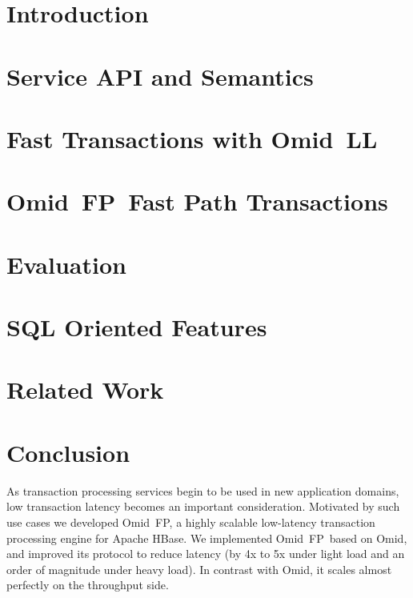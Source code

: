 \documentclass{vldb}
\newcommand{\sys}{Omid~FP}
\newcommand{\sysll}{Omid~LL}
\begin{document}

\section{Introduction} \label{sec:intro}
 

\section{Service API and Semantics} \label{sec:api}


\section{Fast Transactions with \sysll} \label{sec:ll}



\section{\sys\ Fast Path Transactions}
\label{sec:alg}


\section{Evaluation} \label{sec:eval}


\section{SQL Oriented Features} \label{sec:sql}


\section{Related Work} \label{sec:related}


\section{Conclusion} \label{sec:conclusions}

As transaction processing services begin to be used in new application domains, low 
transaction latency becomes an important consideration. 
Motivated by such use cases we developed \sys, a highly scalable 
low-latency transaction processing engine for Apache HBase. 
We implemented \sys\ based on Omid, and 
improved its protocol to reduce latency (by 4x to 5x under light load
and an order of magnitude under heavy load). In contrast with 
Omid, it scales almost perfectly on the throughput side. 
\end{document}
